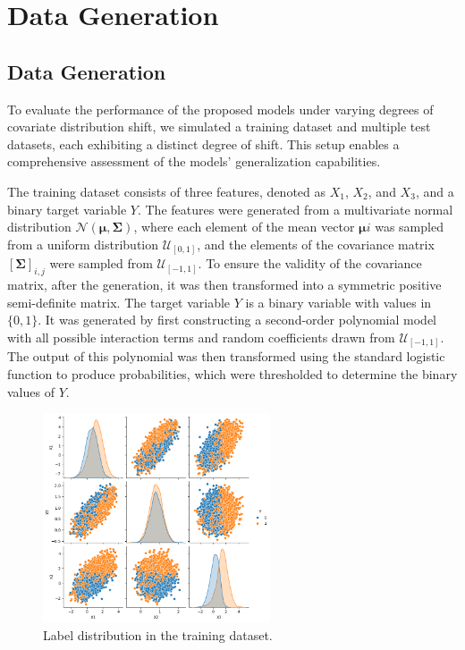 \chapter{Data Generation}

\section{Data Generation}

To evaluate the performance of the proposed models under varying degrees of covariate distribution shift, we simulated a training dataset and multiple test datasets, each exhibiting a distinct degree of shift. 
This setup enables a comprehensive assessment of the models' generalization capabilities.

The training dataset consists of three features, denoted as $X_1$, $X_2$, and $X_3$, and a binary target variable $Y$. The features were generated from a multivariate normal distribution $\mathcal{N}(\boldsymbol{\mu}, \boldsymbol{\Sigma})$, where each element of the mean vector $\boldsymbol{\mu}i$ was sampled from a uniform distribution $\mathcal{U}_{[0, 1]}$, and the elements of the covariance matrix $[\boldsymbol{\Sigma}]_{i,j}$ were sampled from $\mathcal{U}_{[-1, 1]}$. To ensure the validity of the covariance matrix, after the generation, it was then transformed into a symmetric positive semi-definite matrix.
The target variable $Y$ is a binary variable with values in $\{0, 1\}$. It was generated by first constructing a second-order polynomial model with all possible interaction terms and random coefficients drawn from $\mathcal{U}_{[-1, 1]}$. The output of this polynomial was then transformed using the standard logistic function to produce probabilities, which were thresholded to determine the binary values of $Y$.

\begin{figure}
    \centering
    \includegraphics[width=0.6\textwidth]{assets/label_dist_train.png}
    \caption{Label distribution in the training dataset.}
    \label{fig:label_dist_train}
\end{figure}

